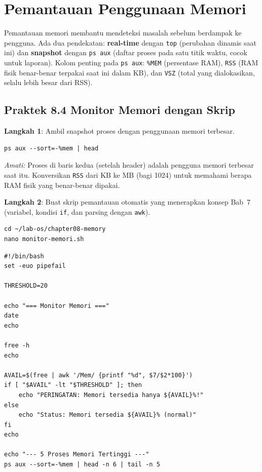 \section{Pemantauan Penggunaan Memori}

Pemantauan memori membantu mendeteksi masalah sebelum berdampak ke pengguna. Ada
dua pendekatan: \textbf{real-time} dengan \texttt{top} (perubahan dinamis saat ini)
dan \textbf{snapshot} dengan \texttt{ps aux} (daftar proses pada satu titik waktu,
cocok untuk laporan). Kolom penting pada \texttt{ps aux}: \texttt{\%MEM} (persentase
RAM), \texttt{RSS} (RAM fisik benar-benar terpakai saat ini dalam KB), dan
\texttt{VSZ} (total  yang dialokasikan, selalu lebih besar dari RSS).

\subsection*{Praktek 8.4 Monitor Memori dengan Skrip}

\textbf{Langkah 1}: Ambil snapshot proses dengan penggunaan memori terbesar.

\begin{lstlisting}[caption={Proses dengan memori terbesar}]
ps aux --sort=-%mem | head
\end{lstlisting}

\textit{Amati:} Proses di baris kedua (setelah header) adalah pengguna memori
terbesar saat itu. Konversikan \texttt{RSS} dari KB ke MB (bagi 1024) untuk
memahami berapa RAM fisik yang benar-benar dipakai.

\textbf{Langkah 2}: Buat skrip pemantauan otomatis yang menerapkan konsep Bab~7
(variabel, kondisi \texttt{if}, dan parsing dengan \texttt{awk}).

\begin{lstlisting}[caption={Pindah ke direktori dan buka nano}]
cd ~/lab-os/chapter08-memory
nano monitor-memori.sh
\end{lstlisting}

\begin{lstlisting}[caption={Isi file monitor-memori.sh}]
#!/bin/bash
set -euo pipefail

THRESHOLD=20

echo "=== Monitor Memori ==="
date
echo

free -h
echo

AVAIL=$(free | awk '/Mem/ {printf "%d", $7/$2*100}')
if [ "$AVAIL" -lt "$THRESHOLD" ]; then
    echo "PERINGATAN: Memori tersedia hanya ${AVAIL}%!"
else
    echo "Status: Memori tersedia ${AVAIL}% (normal)"
fi
echo

echo "--- 5 Proses Memori Tertinggi ---"
ps aux --sort=-%mem | head -n 6 | tail -n 5
\end{lstlisting}


